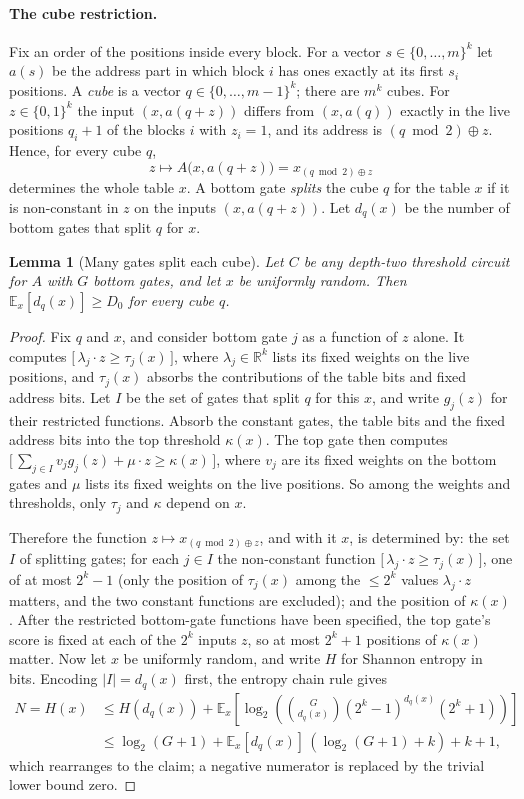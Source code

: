 \documentclass[11pt,letterpaper]{article}
\newtheorem{lemma}[theorem]{Lemma}
\theoremstyle{remark}
\newcommand{\bits}{\{0,1\}}
\newcommand{\ind}[1]{\bigl[\,#1\,\bigr]}
\begin{document}
\paragraph*{The cube restriction.}
Fix an order of the positions inside every block. For a vector
$s\in\{0,\dots,m\}^k$ let $a(s)$ be the address part in which block $i$ has
ones exactly at its first $s_i$ positions. A \emph{cube} is a vector
$q\in\{0,\dots,m-1\}^k$; there are $m^k$ cubes. For $z\in\bits^k$ the input
$(x,a(q+z))$ differs from $(x,a(q))$ exactly in the live positions
$q_i+1$ of the blocks $i$ with $z_i=1$, and its address is
$(q\bmod2)\oplus z$. Hence, for every cube $q$,
\[
z\mapsto A\bigl(x,a(q+z)\bigr)=x_{(q\bmod 2)\oplus z}
\]
determines the whole table $x$. A bottom gate \emph{splits} the cube $q$ for
the table $x$ if it is non-constant in $z$ on the inputs $(x,a(q+z))$. Let
$d_q(x)$ be the number of bottom gates that split $q$ for $x$.

\begin{lemma}[Many gates split each cube]\label{lem:entropy}
Let $C$ be any depth-two threshold circuit for $A$ with $G$ bottom gates, and
let $x$ be uniformly random. Then $\mathbb E_x[d_q(x)]\ge D_0$ for every cube
$q$.
\end{lemma}
\begin{proof}
Fix $q$ and $x$, and consider bottom gate $j$ as a function of $z$ alone.
It computes $\ind{\lambda_j\cdot z\ge\tau_j(x)}$, where
$\lambda_j\in\mathbb R^k$ lists its fixed weights on the live positions,
and $\tau_j(x)$ absorbs the contributions of the table bits and fixed
address bits.
Let $I$ be the set of gates that split $q$ for this $x$, and write $g_j(z)$
for their restricted functions. Absorb the constant gates, the table bits
and the fixed address bits into the top threshold $\kappa(x)$. The top gate
then computes
$\ind{\sum_{j\in I}v_jg_j(z)+\mu\cdot z\ge\kappa(x)}$, where $v_j$ are its
fixed weights on the bottom gates and $\mu$ lists its fixed weights on the
live positions. So among the weights and thresholds, only $\tau_j$ and
$\kappa$ depend on $x$.

Therefore the function $z\mapsto x_{(q\bmod2)\oplus z}$, and with it $x$, is
determined by: the set $I$ of splitting gates; for each $j\in I$ the
non-constant function $\ind{\lambda_j\cdot z\ge\tau_j(x)}$, one of at most
$2^k-1$ (only the position of $\tau_j(x)$ among the $\le2^k$ values
$\lambda_j\cdot z$ matters, and the two constant functions are excluded);
and the position of $\kappa(x)$. After the restricted bottom-gate
functions have been specified, the top gate's score is fixed at each of the
$2^k$ inputs $z$, so at most $2^k+1$ positions of $\kappa(x)$ matter.
Now let $x$ be uniformly random, and write $H$ for Shannon entropy in bits.
Encoding $|I|=d_q(x)$ first, the entropy chain rule gives
\[
\begin{aligned}
N=H(x)&\le H(d_q(x))+\mathbb E_x\!\left[\log_2\!\left(
\binom{G}{d_q(x)}(2^k-1)^{d_q(x)}(2^k+1)\right)\right]\\
&\le\log_2(G+1)+\mathbb E_x[d_q(x)]\,(\log_2(G+1)+k)+k+1,
\end{aligned}
\]
which rearranges to the claim; a negative numerator is replaced by the
trivial lower bound zero.
\end{proof}
\end{document}
